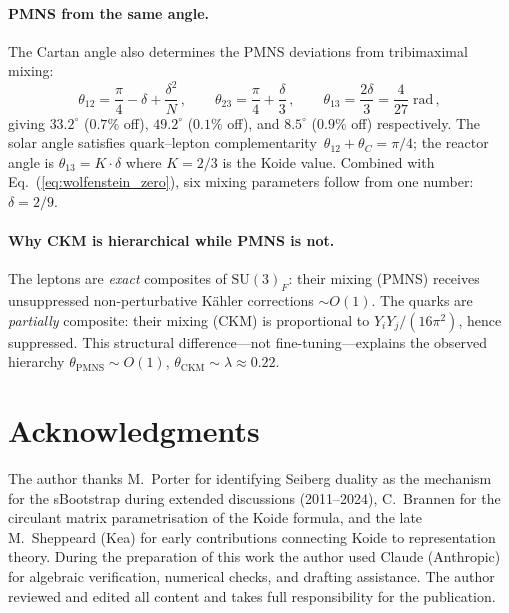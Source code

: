 \documentclass[12pt,a4paper]{article}
\newcommand{\SU}{\mathrm{SU}}
\begin{document}
\paragraph{PMNS from the same angle.}
The Cartan angle also determines the PMNS deviations from tribimaximal
mixing:
\begin{equation}
  \theta_{12} = \frac{\pi}{4} - \delta + \frac{\delta^2}{N}\,,\qquad
  \theta_{23} = \frac{\pi}{4} + \frac{\delta}{3}\,,\qquad
  \theta_{13} = \frac{2\delta}{3} = \frac{4}{27}\;\mathrm{rad}\,,
  \label{eq:pmns_delta}
\end{equation}
giving $33.2^\circ$ ($0.7\%$ off), $49.2^\circ$ ($0.1\%$ off), and
$8.5^\circ$ ($0.9\%$ off) respectively.
The solar angle satisfies quark--lepton
complementarity~$\theta_{12} + \theta_C = \pi/4$; the reactor angle
is $\theta_{13} = K\cdot\delta$ where $K = 2/3$ is the Koide value.
Combined with Eq.~(\ref{eq:wolfenstein_zero}), six mixing parameters
follow from one number: $\delta = 2/9$.

\paragraph{Why CKM is hierarchical while PMNS is not.}
The leptons are \emph{exact} composites of $\SU(3)_F$:
their mixing (PMNS) receives unsuppressed non-perturbative
K\"ahler corrections $\sim O(1)$.
The quarks are \emph{partially} composite:
their mixing (CKM) is proportional to
$Y_i Y_j / (16\pi^2)$, hence suppressed.
This structural difference---not fine-tuning---explains
the observed hierarchy
$\theta_{\mathrm{PMNS}} \sim O(1)$,
$\theta_{\mathrm{CKM}} \sim \lambda \approx 0.22$.


\section*{Acknowledgments}

The author thanks M.~Porter for identifying Seiberg duality as
the mechanism for the sBootstrap during extended discussions
(2011--2024), C.~Brannen for the circulant matrix parametrisation
of the Koide formula, and the late M.~Sheppeard (Kea) for
early contributions connecting Koide to representation theory.
During the preparation of this work the author used Claude
(Anthropic) for algebraic verification, numerical checks,
and drafting assistance.
The author reviewed and edited all content and takes full
responsibility for the publication.
\end{document}
